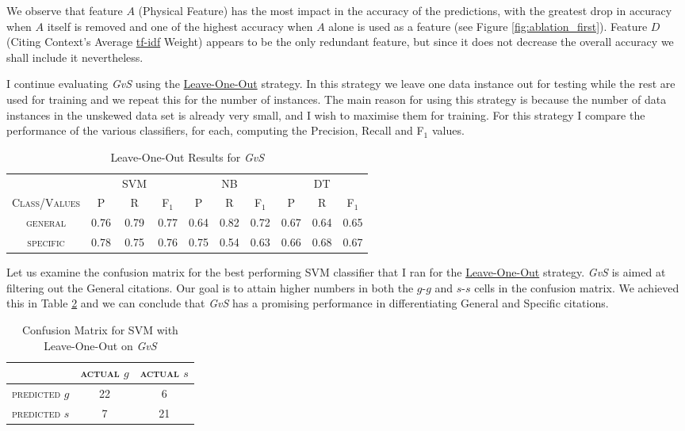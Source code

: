 We observe that feature $A$ (Physical Feature) has the most impact in the accuracy of the predictions, with the greatest drop in accuracy when $A$ itself is removed and one of the highest accuracy when $A$ alone is used as a feature (see Figure \ref{fig:ablation_first}). Feature $D$ (Citing Context's Average \url{tf-idf} Weight) appears to be the only redundant feature, but since it does not decrease the overall accuracy we shall include it nevertheless.

I continue evaluating {\it GvS} using the \url{Leave-One-Out} strategy. In this strategy we leave one data instance out for testing while the rest are used for training and we repeat this for the number of instances. The main reason for using this strategy is because the number of data instances in the unskewed data set is already very small, and I wish to maximise them for training. For this strategy I compare the performance of the various classifiers, for each, computing the Precision, Recall and F$_1$ values.

\begin{table}[h]
	\center
	\begin{tabular}{ c | c  c  c | c c c | c c c}
		& & SVM & & & NB & & & DT \\
		\textsc{Class/Values} & \textsc{P} & \textsc{R} & \textsc{F$_1$} & \textsc{P} & \textsc{R} & \textsc{F$_1$} & \textsc{P} & \textsc{R} & \textsc{F$_1$} \\
		\hline
		\textsc{general} 			& 0.76  &    0.79   &   0.77 & 0.64   &   0.82   &   0.72 & 0.67  &    0.64  &    0.65 \\
		\textsc{specific} 			& 0.78  &    0.75   &   0.76 & 0.75   &   0.54   &   0.63 & 0.66  &    0.68  &    0.67 \\
	\end{tabular}
	\caption{Leave-One-Out Results for {\it GvS}}
	\label{tab:firsttieresults}
\end{table}

Let us examine the confusion matrix for the best performing SVM classifier that I ran for the \url{Leave-One-Out} strategy. {\it GvS} is aimed at filtering out the General citations. Our goal is to attain higher numbers in both the $g$-$g$ and $s$-$s$ cells in the confusion matrix. We achieved this in Table \ref{tab:firstsvmconfusionmatrix} and we can conclude that {\it GvS} has a promising performance in differentiating General and Specific citations.

\begin{table}[h]
	\center
	\begin{tabular}{ c | c  c }
		 & \textsc{actual $g$} & \textsc{actual $s$} \\
		\hline
		\textsc{predicted $g$} 	& 22 & 6 \\
		\textsc{predicted $s$}		& 7 & 21
	\end{tabular}
	\caption{Confusion Matrix for SVM with Leave-One-Out on {\it GvS}}
	\label{tab:firstsvmconfusionmatrix}
\end{table}

